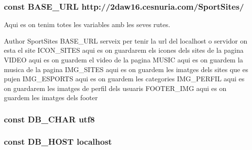 \subsubsection[{B\+A\+S\+E\+\_\+\+U\+R\+L}]{\setlength{\rightskip}{0pt plus 5cm}const B\+A\+S\+E\+\_\+\+U\+R\+L \textquotesingle{}http\+://2daw16.\+cesnuria.\+com/\+Sport\+Sites/\textquotesingle{}}\label{_config_8php_ac2f7c46cdf071163a82cb95295eca57f}
Aqui es on tenim totes les variables amb les seves rutes.

\begin{DoxyAuthor}{Author}
Sport\+Sites B\+A\+S\+E\+\_\+\+U\+R\+L serveix per tenir la url del localhost o servidor on esta el site I\+C\+O\+N\+\_\+\+S\+I\+T\+E\+S aqui es on guardarem els icones dels sites de la pagina V\+I\+D\+E\+O aqui es on guardem el video de la pagina M\+U\+S\+I\+C aqui es on guardem la musica de la pagina I\+M\+G\+\_\+\+S\+I\+T\+E\+S aqui es on guardem les imatges dels sites que es pujen I\+M\+G\+\_\+\+E\+S\+P\+O\+R\+T\+S aqui es on guardem les categories I\+M\+G\+\_\+\+P\+E\+R\+F\+I\+L aqui es on guardarem les imatges de perfil dels usuaris F\+O\+O\+T\+E\+R\+\_\+\+I\+M\+G aqui es on guardem les imatges dels footer 
\end{DoxyAuthor}
\hypertarget{_config_8php_ac39b082e3110f9c9d60da88c896ec24b}{}
\subsubsection[{D\+B\+\_\+\+C\+H\+A\+R}]{\setlength{\rightskip}{0pt plus 5cm}const D\+B\+\_\+\+C\+H\+A\+R \textquotesingle{}utf8\textquotesingle{}}\label{_config_8php_ac39b082e3110f9c9d60da88c896ec24b}
\hypertarget{_config_8php_a293363d7988627f671958e2d908c202a}{}
\subsubsection[{D\+B\+\_\+\+H\+O\+S\+T}]{\setlength{\rightskip}{0pt plus 5cm}const D\+B\+\_\+\+H\+O\+S\+T \textquotesingle{}localhost\textquotesingle{}}\label{_config_8php_a293363d7988627f671958e2d908c202a}
\hypertarget{_config_8php_ab5db0d3504f917f268614c50b02c53e2}{}
